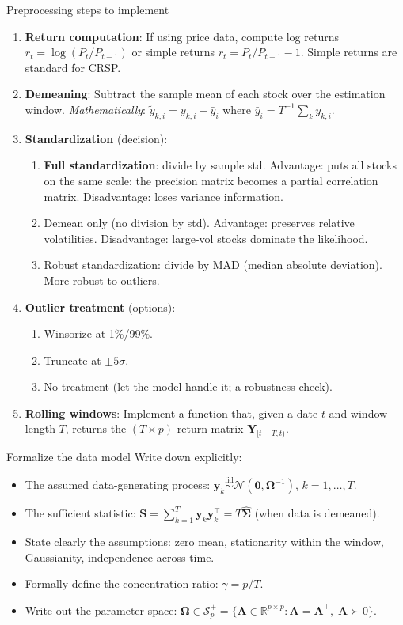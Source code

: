 \documentclass[11pt,a4paper]{article}
\newcommand{\R}{\mathbb{R}}
\newcommand{\Normal}{\mathcal{N}}
\newcommand{\Spp}{\mathcal{S}^{+}_p}
\newcommand{\bOmega}{\bm{\Omega}}
\newcommand{\bSigma}{\bm{\Sigma}}
\begin{document}
\begin{action}{Preprocessing steps to implement}
\begin{enumerate}
  \item \textbf{Return computation}: If using price data, compute log returns $r_t = \log(P_t/P_{t-1})$ or simple returns $r_t = P_t/P_{t-1} - 1$. Simple returns are standard for CRSP.
  \item \textbf{Demeaning}: Subtract the sample mean of each stock over the estimation window. \emph{Mathematically}: $\tilde{y}_{k,i} = y_{k,i} - \bar{y}_i$ where $\bar{y}_i = T^{-1}\sum_k y_{k,i}$.
  \item \textbf{Standardization} (decision):
  \begin{enumerate}[nosep]
    \item[(i)] \textbf{Full standardization}: divide by sample std. Advantage: puts all stocks on the same scale; the precision matrix becomes a partial correlation matrix. Disadvantage: loses variance information.
    \item[(ii)] Demean only (no division by std). Advantage: preserves relative volatilities. Disadvantage: large-vol stocks dominate the likelihood.
    \item[(iii)] Robust standardization: divide by MAD (median absolute deviation). More robust to outliers.
  \end{enumerate}
  \item \textbf{Outlier treatment} (options):
  \begin{enumerate}[nosep]
    \item[(i)] Winsorize at 1\%/99\%.
    \item[(ii)] Truncate at $\pm 5\sigma$.
    \item[(iii)] No treatment (let the model handle it; a robustness check).
  \end{enumerate}
  \item \textbf{Rolling windows}: Implement a function that, given a date $t$ and window length $T$, returns the $(T \times p)$ return matrix $\bm{Y}_{[t-T, t)}$.
\end{enumerate}
\end{action}

\begin{mathbox}{Formalize the data model}
Write down explicitly:
\begin{itemize}[nosep]
  \item The assumed data-generating process: $\bm{y}_k \stackrel{\text{iid}}{\sim} \Normal(\bm{0}, \bOmega^{-1})$, $k=1,\ldots,T$.
  \item The sufficient statistic: $\bm{S} = \sum_{k=1}^T \bm{y}_k \bm{y}_k^\top = T \hat{\bSigma}$ (when data is demeaned).
  \item State clearly the assumptions: zero mean, stationarity within the window, Gaussianity, independence across time.
  \item Formally define the concentration ratio: $\gamma = p / T$.
  \item Write out the parameter space: $\bOmega \in \Spp = \{\bm{A} \in \R^{p \times p} : \bm{A} = \bm{A}^\top,\; \bm{A} \succ 0\}$.
\end{itemize}
\end{mathbox}
\end{document}
